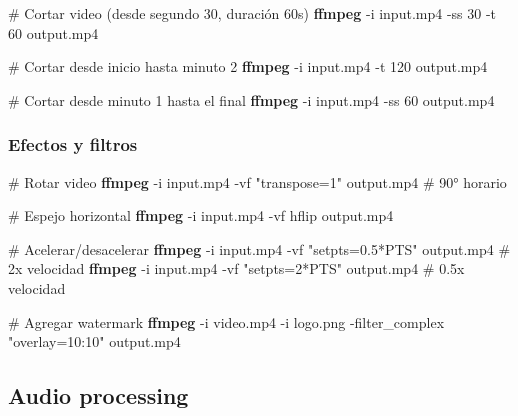 \documentclass[
  11pt,
  letterpaper,
  oneside,
  openany]{scrbook}
\newenvironment{Shaded}{}{}
\newcommand{\AttributeTok}[1]{\textcolor[rgb]{0.84,0.23,0.29}{#1}}
\newcommand{\CommentTok}[1]{\textcolor[rgb]{0.42,0.45,0.49}{#1}}
\newcommand{\ExtensionTok}[1]{\textcolor[rgb]{0.84,0.23,0.29}{\textbf{#1}}}
\newcommand{\NormalTok}[1]{\textcolor[rgb]{0.14,0.16,0.18}{#1}}
\newcommand{\StringTok}[1]{\textcolor[rgb]{0.01,0.18,0.38}{#1}}
\begin{document}
\begin{Shaded}
\begin{Highlighting}[]
\CommentTok{\# Cortar video (desde segundo 30, duración 60s)}
\ExtensionTok{ffmpeg} \AttributeTok{{-}i}\NormalTok{ input.mp4 }\AttributeTok{{-}ss}\NormalTok{ 30 }\AttributeTok{{-}t}\NormalTok{ 60 output.mp4}

\CommentTok{\# Cortar desde inicio hasta minuto 2}
\ExtensionTok{ffmpeg} \AttributeTok{{-}i}\NormalTok{ input.mp4 }\AttributeTok{{-}t}\NormalTok{ 120 output.mp4}

\CommentTok{\# Cortar desde minuto 1 hasta el final}
\ExtensionTok{ffmpeg} \AttributeTok{{-}i}\NormalTok{ input.mp4 }\AttributeTok{{-}ss}\NormalTok{ 60 output.mp4}
\end{Highlighting}
\end{Shaded}

\subsubsection{Efectos y filtros}\label{efectos-y-filtros}

\begin{Shaded}
\begin{Highlighting}[]
\CommentTok{\# Rotar video}
\ExtensionTok{ffmpeg} \AttributeTok{{-}i}\NormalTok{ input.mp4 }\AttributeTok{{-}vf} \StringTok{"transpose=1"}\NormalTok{ output.mp4  }\CommentTok{\# 90° horario}

\CommentTok{\# Espejo horizontal}
\ExtensionTok{ffmpeg} \AttributeTok{{-}i}\NormalTok{ input.mp4 }\AttributeTok{{-}vf}\NormalTok{ hflip output.mp4}

\CommentTok{\# Acelerar/desacelerar}
\ExtensionTok{ffmpeg} \AttributeTok{{-}i}\NormalTok{ input.mp4 }\AttributeTok{{-}vf} \StringTok{"setpts=0.5*PTS"}\NormalTok{ output.mp4  }\CommentTok{\# 2x velocidad}
\ExtensionTok{ffmpeg} \AttributeTok{{-}i}\NormalTok{ input.mp4 }\AttributeTok{{-}vf} \StringTok{"setpts=2*PTS"}\NormalTok{ output.mp4   }\CommentTok{\# 0.5x velocidad}

\CommentTok{\# Agregar watermark}
\ExtensionTok{ffmpeg} \AttributeTok{{-}i}\NormalTok{ video.mp4 }\AttributeTok{{-}i}\NormalTok{ logo.png }\AttributeTok{{-}filter\_complex} \StringTok{"overlay=10:10"}\NormalTok{ output.mp4}
\end{Highlighting}
\end{Shaded}

\subsection{Audio processing}\label{audio-processing}
\end{document}
